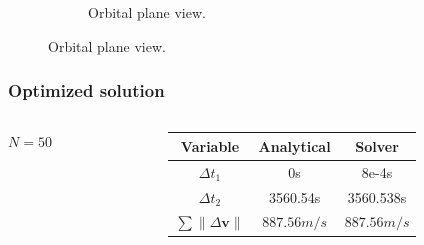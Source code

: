 \documentclass[handout]{beamer}
\begin{document}
\begin{frame}
\begin{figure}[htbp]
\begin{subfigure}{0.49\textwidth}
            \caption{Orbital plane view.}
        \end{subfigure}
        \label{fig:hohmann_lambert}
    \end{figure}

\end{frame}

\begin{frame}
    \frametitle{Optimized solution}
    \begin{columns}
        \begin{column}{0.3\textwidth}\centering
            \(N = 50\)
        \end{column}
        \begin{column}{0.7\textwidth}
            \begin{table}[htbp]
                \centering
                \begin{tabular}{ccc} \toprule
                    Variable & Analytical & Solver \\ \midrule
                    \(\Delta t_1\) & 0s & 8e-4s \\
                    \(\Delta t_2\) & 3560.54s & 3560.538s \\
                    \(\sum \lVert \Delta \mathbf{v} \rVert\) & \(887.56m/s\) & \(887.56m/s\) \\ \bottomrule
                \end{tabular}
                \label{tab:hohmann_results}
            \end{table}
        \end{column}
    \end{columns}
    

\end{frame}
\end{document}
